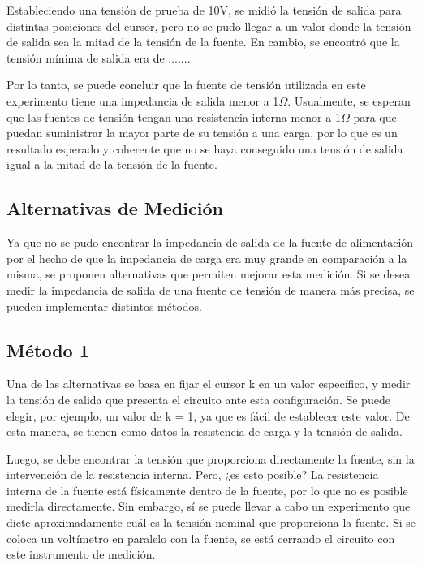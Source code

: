 \documentclass[12pt,oneside,a4paper]{article}
\begin{document}
Estableciendo una tensión de prueba de 10V, se midió la tensión de salida para distintas posiciones 
del cursor, pero no se pudo llegar a un valor donde la tensión de salida sea la mitad de la tensión 
de la fuente. En cambio, se encontró que la tensión mínima de salida era de .......

Por lo tanto, se puede concluir que la fuente de tensión utilizada en este experimento tiene una 
impedancia de salida menor a 1$\Omega$. Usualmente, se esperan que las fuentes de tensión tengan 
una resistencia interna menor a 1$\Omega$ para que puedan suministrar la mayor parte de su tensión 
a una carga, por lo que es un resultado esperado y coherente que no se haya conseguido 
una tensión de salida igual a la mitad de la tensión de la fuente.

\subsection{Alternativas de Medición}

Ya que no se pudo encontrar la impedancia de salida de la fuente de alimentación por el hecho de 
que la impedancia de carga era muy grande en comparación a la misma, se proponen alternativas que 
permiten mejorar esta medición. Si se desea medir la impedancia de salida de una fuente de tensión 
de manera más precisa, se pueden implementar distintos métodos.

\subsection*{Método 1}

Una de las alternativas se basa en fijar el cursor k en un valor específico, y medir la tensión de 
salida que presenta el circuito ante esta configuración. Se puede elegir, por ejemplo, un valor de 
k = 1, ya que es fácil de establecer este valor. De esta manera, se tienen como datos la resistencia 
de carga y la tensión de salida. 

Luego, se debe encontrar la tensión que proporciona directamente la fuente, sin la intervención 
de la resistencia interna. Pero, ¿es esto posible? La resistencia interna de la fuente está 
físicamente dentro de la fuente, por lo que no es posible medirla directamente. Sin embargo, 
sí se puede llevar a cabo un experimento que dicte aproximadamente cuál es la tensión nominal 
que proporciona la fuente. Si se coloca un voltímetro en paralelo con la fuente, se está cerrando 
el circuito con este instrumento de medición. 
\end{document}

